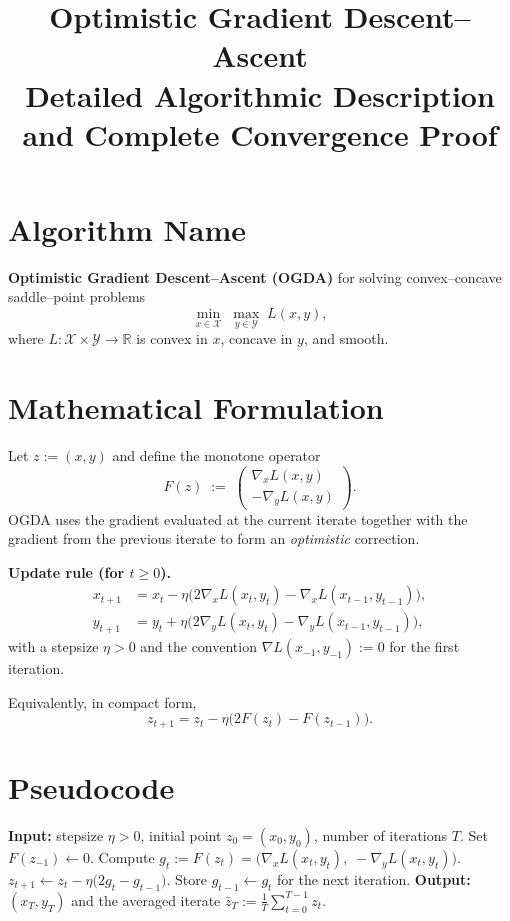 \documentclass[11pt]{article}
\newcommand{\R}{\mathbb{R}}
\begin{document}
\title{Optimistic Gradient Descent–Ascent \\ Detailed Algorithmic Description and Complete Convergence Proof}
\author{}
\date{}
\maketitle

\section*{Algorithm Name}
\textbf{Optimistic Gradient Descent–Ascent (OGDA)} for solving convex–concave saddle–point problems
\[
\min_{x\in\mathcal X}\;\max_{y\in\mathcal Y}\;L(x,y),
\]
where $L:\mathcal X\times\mathcal Y\rightarrow\R$ is convex in $x$, concave in $y$, and smooth.

\section*{Mathematical Formulation}
Let $z:=(x,y)$ and define the monotone operator
\[
F(z)\;:=\;\begin{pmatrix}
\nabla_x L(x,y)\\[2mm]
-\nabla_y L(x,y)
\end{pmatrix}.
\]
OGDA uses the gradient evaluated at the current iterate together with the gradient from the previous iterate to form an \emph{optimistic} correction.

\bigskip
\noindent\textbf{Update rule (for $t\ge 0$).}
\[
\begin{aligned}
x_{t+1}&=x_t-\eta\bigl(2\nabla_x L(x_t,y_t)-\nabla_x L(x_{t-1},y_{t-1})\bigr),\\[2mm]
y_{t+1}&=y_t+\eta\bigl(2\nabla_y L(x_t,y_t)-\nabla_y L(x_{t-1},y_{t-1})\bigr),
\end{aligned}
\tag{OGDA}
\]
with a stepsize $\eta>0$ and the convention $\nabla L(x_{-1},y_{-1}):=0$ for the first iteration.

Equivalently, in compact form,
\[
z_{t+1}=z_t-\eta\bigl(2F(z_t)-F(z_{t-1})\bigr).
\]

\section*{Pseudocode}
\begin{algorithm}[H]
\caption{Optimistic Gradient Descent–Ascent (OGDA)}
\begin{algorithmic}[1]
\STATE \textbf{Input:} stepsize $\eta>0$, initial point $z_0=(x_0,y_0)$, number of iterations $T$.
\STATE Set $F(z_{-1})\gets 0$.
    \STATE Compute $g_t:=F(z_t)=\bigl(\nabla_x L(x_t,y_t),\;-\nabla_y L(x_t,y_t)\bigr)$.
    \STATE $z_{t+1}\gets z_t-\eta\bigl(2g_t-g_{t-1}\bigr)$.
    \STATE Store $g_{t-1}\gets g_t$ for the next iteration.
\ENDFOR
\STATE \textbf{Output:} $(x_T,y_T)$ and the averaged iterate $\bar z_T:=\frac1T\sum_{t=0}^{T-1}z_t$.
\end{algorithmic}
\end{algorithm}
\end{document}
